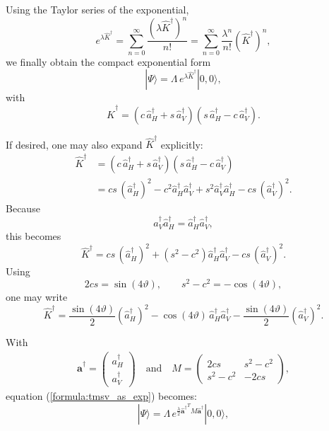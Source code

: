 \documentclass[%
 reprint,
 amsmath,amssymb,
 aps,
twocolumn
]{revtex4-2}
\begin{document}
Using the Taylor series of the exponential,
\begin{equation}
e^{\lambda \hat K^\dagger}
=
\sum_{n=0}^{\infty}
\frac{(\lambda \hat K^\dagger)^n}{n!}
=
\sum_{n=0}^{\infty}
\frac{\lambda^n}{n!}
(\hat K^\dagger)^n,
\end{equation}
we finally obtain the compact exponential form
\begin{equation}\label{formula:tmsv_as_exp}
\boxed{
|\Psi\rangle
=
\Lambda\, e^{\lambda \hat K^\dagger}|0,0\rangle,
 }
\end{equation}
with
\begin{equation}
\boxed{
\hat K^\dagger
=
\left(c\,\hat a_H^\dagger + s\,\hat a_V^\dagger\right)
\left(s\,\hat a_H^\dagger - c\,\hat a_V^\dagger\right).
}
\end{equation}

If desired, one may also expand $\hat K^\dagger$ explicitly:
\begin{align}
\hat K^\dagger
&=
\left(c\,\hat a_H^\dagger + s\,\hat a_V^\dagger\right)
\left(s\,\hat a_H^\dagger - c\,\hat a_V^\dagger\right) \\
&=
cs\,(\hat a_H^\dagger)^2
-c^2 \hat a_H^\dagger \hat a_V^\dagger
+s^2 \hat a_V^\dagger \hat a_H^\dagger
-cs\,(\hat a_V^\dagger)^2.
\end{align}
Because
\begin{equation}
\hat a_V^\dagger \hat a_H^\dagger
=
\hat a_H^\dagger \hat a_V^\dagger,
\end{equation}
this becomes
\begin{equation}
\hat K^\dagger
=
cs\,(\hat a_H^\dagger)^2
+
(s^2-c^2)\hat a_H^\dagger \hat a_V^\dagger
-cs\,(\hat a_V^\dagger)^2.
\end{equation}
Using
\begin{equation}
2cs=\sin(4\vartheta),
\qquad
s^2-c^2=-\cos(4\vartheta),
\end{equation}
one may write
\begin{equation}
\hat K^\dagger
=
\frac{\sin(4\vartheta)}{2}(\hat a_H^\dagger)^2
-\cos(4\vartheta)\,\hat a_H^\dagger \hat a_V^\dagger
-\frac{\sin(4\vartheta)}{2}(\hat a_V^\dagger)^2.
\end{equation}

With
\begin{align}\label{eq:alpha_vec}
    \mathbf{\hat a^{\dagger}}=
    \begin{pmatrix}
    a_{H}^\dagger  \\
    a_{V}^\dagger
    \end{pmatrix}\quad \text{and}\quad 
    M=
    \begin{pmatrix}
    2cs & s^2-c^2 \\
    s^2-c^2 & -2cs
    \end{pmatrix},
\end{align}
equation (\ref{formula:tmsv_as_exp}) becomes:
\begin{equation}\label{formula:tmsv_as_exp_2}
\boxed{
|\Psi\rangle
=
\Lambda\, e^{\frac{\lambda}{2} \mathbf{\hat a^{\dagger}}^TM\mathbf{\hat a^{\dagger}}}|0,0\rangle,
}
\end{equation}
\end{document}
